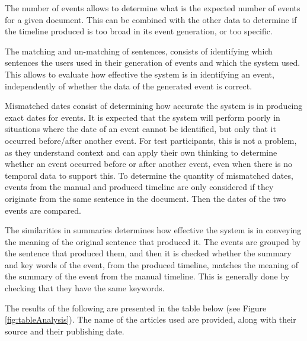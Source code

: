 \par The number of events allows to determine what is the expected number of events for a given document. This can be combined with the other data to determine if the timeline produced is too broad in its event generation, or too specific.

\par The matching and un-matching of sentences, consists of identifying which sentences the users used in their generation of events and which the system used. This allows to evaluate how effective the system is in identifying an event, independently of whether the data of the generated event is correct.

\par Mismatched dates consist of determining how accurate the system is in producing exact dates for events. It is expected that the system will perform poorly in situations where the date of an event cannot be identified, but only that it occurred before/after another event. For test participants, this is not a problem, as they understand context and can apply their own thinking to determine whether an event occurred before or after another event, even when there is no temporal data to support this. To determine the quantity of mismatched dates, events from the manual and produced timeline are only considered if they originate from the same sentence in the document. Then the dates of the two events are compared.

\par The similarities in summaries determines how effective the system is in conveying the meaning of the original sentence that produced it. The events are grouped by the sentence that produced them, and then it is checked whether the summary and key words of the event, from the produced timeline, matches the meaning of the summary of the event from the manual timeline. This is generally done by checking that they have the same keywords.

\par The results of the following are presented in the table below (see Figure \ref{fig:tableAnalysis}). The name of the articles used are provided, along with their source and their publishing date.

